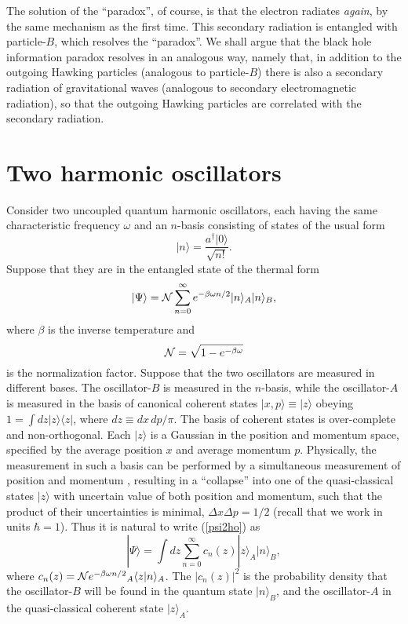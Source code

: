 \documentclass[12pt]{article}
\begin{document}
The solution of the ``paradox'', of course, is that the electron radiates {\em again}, by the same mechanism as the 
first time. This secondary radiation is entangled with particle-$B$, which resolves the ``paradox''.
We shall argue that the black hole information paradox resolves in an analogous way, namely that, in addition to 
the outgoing Hawking particles (analogous to particle-$B$) there is also a secondary radiation of gravitational waves 
(analogous to secondary electromagnetic radiation), so that the outgoing Hawking particles are correlated with 
the secondary radiation.

\section{Two harmonic oscillators}

Consider two uncoupled quantum harmonic oscillators, each having the same 
characteristic frequency $\omega$ and an $n$-basis consisting of states of the usual form
\begin{equation}
 |n\rangle=\frac{a^{\dagger}|0\rangle}{\sqrt{n!}} .
\end{equation}
Suppose that they are in the entangled state of the thermal form
\begin{equation}\label{psi2ho}
 |\Psi\rangle = {\cal N}\sum_{n=0}^{\infty} e^{-\beta\omega n/2} |n\rangle_A |n\rangle_B ,
\end{equation}
where $\beta$ is the inverse temperature and 
\begin{equation}
{\cal N}=\sqrt{1-e^{-\beta\omega}}
\end{equation}
is the normalization factor. Suppose that the two oscillators are measured in different bases. The oscillator-$B$
is measured in the $n$-basis, while the oscillator-$A$ is measured in the basis of canonical coherent states \cite{ballentine} 
$|x,p\rangle\equiv|z\rangle$ obeying $1=\int dz |z\rangle\langle z|$, where $dz\equiv dx\,dp/\pi$.
The basis of coherent states is over-complete and non-orthogonal. Each $|z\rangle$ is a Gaussian in the position and 
momentum space, specified by the average position $x$ and average momentum $p$.
Physically, the measurement in such a basis can be performed by a simultaneous measurement of position and momentum 
\cite{arthurs,stenholm},
resulting in a ``collapse'' into one of the quasi-classical states $|z\rangle$ with uncertain value of both position and momentum, 
such that the product of their uncertainties is minimal, $\Delta x \Delta p= 1/2$ (recall that we work in units $\hbar=1$).
Thus it is natural to write (\ref{psi2ho}) as 
\begin{equation}\label{psi2ho2}
 |\Psi\rangle = \int dz \sum_{n=0}^{\infty} c_n(z) |z\rangle_A |n\rangle_B ,
\end{equation}
where $c_n(z)={\cal N} e^{-\beta\omega n/2} {}_A\langle z|n\rangle_A$. The $|c_n(z)|^2$ is the probability density that 
the oscillator-$B$ will be found in the quantum state $|n\rangle_B$, and the oscillator-$A$ in the quasi-classical
coherent state $|z\rangle_A$.
\end{document}

